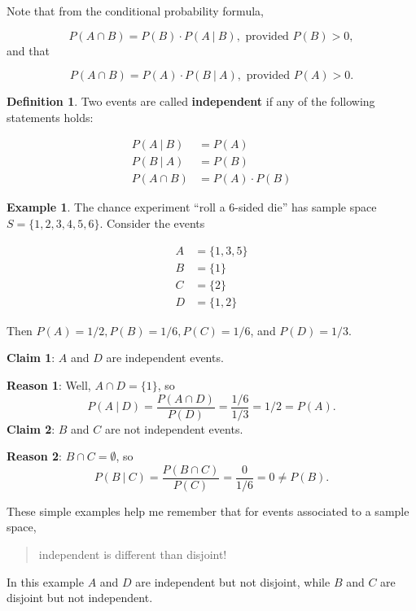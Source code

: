 \documentclass[
]{book}
\theoremstyle{definition}
\newtheorem{definition}{Definition}[chapter]
\theoremstyle{definition}
\newtheorem{example}{Example}[chapter]
\theoremstyle{definition}
\theoremstyle{definition}
\theoremstyle{remark}
\begin{document}
Note that from the conditional probability formula,

\[P(A \cap B) = P(B) \cdot P(A~|~B), \text{ provided }P(B)>0,\]
and that

\[P(A \cap B) = P(A) \cdot P(B~|~A), \text{ provided }P(A)>0.\]

\begin{definition}
Two events are called \textbf{independent} if any of the following statements holds:

\begin{align*}
  P(A~|~B) &= P(A) \\
  P(B~|~A) &= P(B) \\
  P(A \cap B) &= P(A)\cdot P(B)
\end{align*}
\end{definition}

\begin{example}
The chance experiment ``roll a 6-sided die'' has sample space \(S = \{1, 2, 3, 4, 5, 6\}\).
Consider the events

\begin{align*}
A &= \{1,3,5\}\\
B &= \{1\}\\
C &= \{2\}\\
D &= \{1,2\}
\end{align*}

Then \(P(A) = 1/2, P(B) = 1/6, P(C) = 1/6\), and \(P(D) = 1/3.\)

\textbf{Claim 1}: \(A\) and \(D\) are independent events.

\textbf{Reason 1}: Well, \(A \cap D = \{1\}\), so
\[P(A~|~D) = \frac{P(A\cap D)}{P(D)} = \frac{1/6}{1/3} = 1/2 = P(A).\]
\textbf{Claim 2}: \(B\) and \(C\) are not independent events.

\textbf{Reason 2}: \(B \cap C = \emptyset\), so \[P(B~|~C) = \frac{P(B\cap C)}{P(C)} = \frac{0}{1/6} = 0 \neq P(B).\]

These simple examples help me remember that for events associated to a sample space,

\begin{quote}
independent is different than disjoint!
\end{quote}

In this example \(A\) and \(D\) are independent but not disjoint, while \(B\) and \(C\) are disjoint but not independent.
\end{example}
\end{document}
